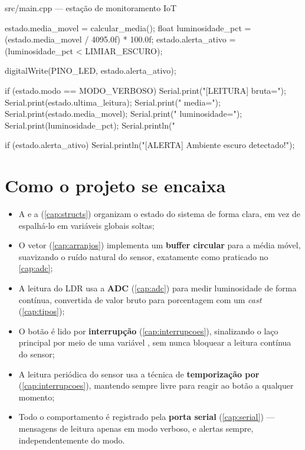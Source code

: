 \begin{codigoc}{src/main.cpp — estação de monitoramento IoT}
{{        estado.media_movel = calcular_media();
        float luminosidade_pct = (estado.media_movel / 4095.0f) * 100.0f;
        estado.alerta_ativo = (luminosidade_pct < LIMIAR_ESCURO);

        digitalWrite(PINO_LED, estado.alerta_ativo);

        if (estado.modo == MODO_VERBOSO) {
            Serial.print("[LEITURA] bruta=");
            Serial.print(estado.ultima_leitura);
            Serial.print(" media=");
            Serial.print(estado.media_movel);
            Serial.print(" luminosidade=");
            Serial.print(luminosidade_pct);
            Serial.println("%
        }

        if (estado.alerta_ativo) {
            Serial.println("[ALERTA] Ambiente escuro detectado!");
        }
    }
}
\end{codigoc}

\section{Como o projeto se encaixa}

\begin{itemize}
    \item A  e a  (\cref{cap:structs}) organizam o estado do sistema de forma clara, em vez de espalhá-lo em variáveis globais soltas;
    \item O vetor  (\cref{cap:arranjos}) implementa um \textbf{buffer circular} para a média móvel, suavizando o ruído natural do sensor, exatamente como praticado no \cref{cap:adc};
    \item A leitura do LDR usa a \textbf{ADC} (\cref{cap:adc}) para medir luminosidade de forma contínua, convertida de valor bruto para porcentagem com um \emph{cast} (\cref{cap:tipos});
    \item O botão é lido por \textbf{interrupção} (\cref{cap:interrupcoes}), sinalizando o laço principal por meio de uma variável , sem nunca bloquear a leitura contínua do sensor;
    \item A leitura periódica do sensor usa a técnica de \textbf{temporização por } (\cref{cap:interrupcoes}), mantendo  sempre livre para reagir ao botão a qualquer momento;
    \item Todo o comportamento é registrado pela \textbf{porta serial} (\cref{cap:serial}) — mensagens de leitura apenas em modo verboso, e alertas sempre, independentemente do modo.
\end{itemize}

